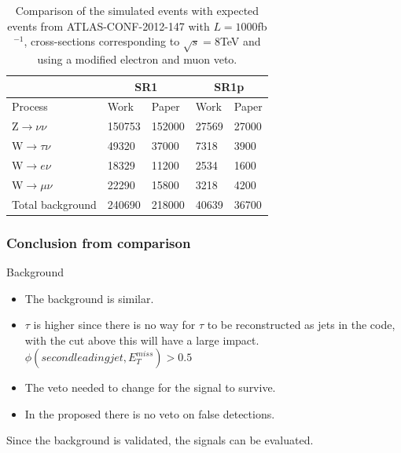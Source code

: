 \documentclass[handout]{beamer}
\begin{document}
\begin{frame}[shrink=33]
\begin{table}[ht]
\begin{center}
\begin{tabular}{|l|l|l|l|l|}
\hline
& \multicolumn{2}{c}{SR1} & \multicolumn{2}{|c|}{SR1p} \\
\hline
Process & Work  & Paper & Work & Paper  \\ \hline
Z$\rightarrow\nu\nu$ & 150753 & 152000 & 27569 & 27000 \\
W$\rightarrow\tau\nu$ & 49320 & 37000 & 7318 & 3900 \\
W$\rightarrow e\nu$ & 18329 & 11200 & 2534 & 1600 \\
W$\rightarrow\mu\nu$ & 22290 & 15800 & 3218 & 4200 \\ \hline
Total background & 240690 & 218000 & 40639 & 36700 \\ \hline
\end{tabular}
\caption{Comparison of the simulated events with expected events from ATLAS-CONF-2012-147 with $L=1000$fb$^{-1}$, cross-sections corresponding to $\sqrt{s}=8$TeV and using a modified electron and muon veto.}
\label{tab:newcomp}
\end{center}
\end{table}
\end{frame}

\begin{frame}[shrink=0]\frametitle{Conclusion from comparison}
\begin{block}{Background}
\begin{itemize}
\item The background is similar.
\item $\tau$ is higher since there is no way for $\tau$ to be reconstructed as jets in the code, with the cut above this will have a large impact. $\phi (second leading jet, E_T^{miss})>0.5$
\item The veto needed to change for the signal to survive.
\item In the proposed there is no veto on false detections.
\end{itemize}
\end{block}
\begin{block}{}
Since the background is validated, the signals can be evaluated.
\end{block}
\end{frame}
\end{document}
